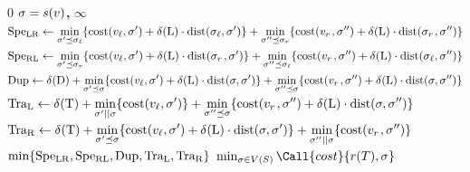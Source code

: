 \begin{algorithm}
    \capstart
    \begin{algorithmic}[1]
                \Return \(0\) {\algorithmicif} \(\sigma = s(v)\)\textbf{,} {\algorithmicelse} \(\infty\) \;
            \EndIf
            \State \(\displaystyle\mathrm{Spe_{LR}} \gets \min_{\sigma' \preceq \sigma_\mathit{\ell}} \{
                \mathrm{cost}(v_\mathit{\ell}, \sigma') + \delta\kern.1pt(\mathrm{L}) \cdot \mathrm{dist}(\sigma_\mathit{\ell}, \sigma')
            \} + \min_{\sigma'' \preceq \sigma_r} \{
                \mathrm{cost}(v_r\kern1pt, \sigma'') + \delta\kern.1pt(\mathrm{L}) \cdot \mathrm{dist}(\sigma_r\kern1pt, \sigma'')
            \}\)
            \State \(\displaystyle\mathrm{Spe_{RL}} \gets \min_{\sigma' \preceq \sigma_r} \{
                \mathrm{cost}(v_\mathit{\ell}, \sigma') + \delta\kern.1pt(\mathrm{L}) \cdot \mathrm{dist}(\sigma_r\kern1pt, \sigma')
            \} + \min_{\sigma'' \preceq \sigma_\mathit{\ell}} \{
                \mathrm{cost}(v_r\kern1pt, \sigma'') + \delta\kern.1pt(\mathrm{L}) \cdot \mathrm{dist}(\sigma_\mathit{\ell}, \sigma'')
            \}\)
            \State \(\displaystyle\mathrm{Dup} \gets \delta\kern.1pt(\mathrm{D}) + \min_{\sigma' \preceq \sigma} \{
                \mathrm{cost}(v_\mathit{\ell}, \sigma') + \delta\kern.1pt(\mathrm{L}) \cdot \mathrm{dist}(\sigma, \sigma')
            \} + \min_{\sigma'' \preceq \sigma} \{
                \mathrm{cost}(v_r\kern1pt, \sigma'') + \delta\kern.1pt(\mathrm{L}) \cdot \mathrm{dist}(\sigma, \sigma'')
            \}\)
            \State \(\displaystyle\mathrm{Tra_L} \gets \delta\kern.1pt(\mathrm{T}) + \min_{\sigma' \mathrel{||} \sigma} \{
                \mathrm{cost}(v_\mathit{\ell}, \sigma')
            \} + \min_{\sigma'' \preceq \sigma} \{
                \mathrm{cost}(v_r\kern1pt, \sigma'') + \delta\kern.1pt(\mathrm{L}) \cdot \mathrm{dist}(\sigma, \sigma'')
            \}\)
            \State \(\displaystyle\mathrm{Tra_R} \gets \delta\kern.1pt(\mathrm{T}) + \min_{\sigma' \preceq \sigma} \{
                \mathrm{cost}(v_\mathit{\ell}, \sigma') + \delta\kern.1pt(\mathrm{L}) \cdot \mathrm{dist}(\sigma, \sigma')
            \} + \min_{\sigma'' \mathrel{||} \sigma} \{
                \mathrm{cost}(v_r\kern1pt, \sigma'')
            \}\)
            \State \Return \(\min\{\mathrm{Spe_{LR}}, \mathrm{Spe_{RL}}, \mathrm{Dup}, \mathrm{Tra_L}, \mathrm{Tra_R}\}\)
        \EndFunction
        \State \Return \(\min_{\sigma \in \tnodes(S)}\Call{cost}{\troot(T), \sigma}\)
    \end{algorithmic}
    \caption{
        Recursive algorithm for the \(\recmodelDTL\)-parsimony problem.
        \label{alg:reconciliation:dtl-parcimonie}
    }
\end{algorithm}

